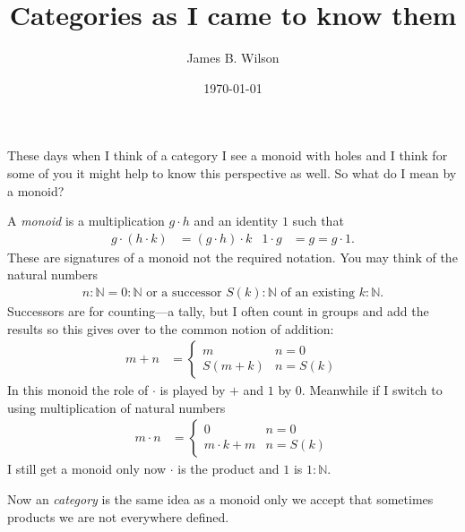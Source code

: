 \documentclass[12pt,twoside,letterpaper]{memoir}
\begin{document}
\author{James B. Wilson}
\title{Categories as I came to know them}
\date{\today}
\maketitle

These days when I think of a category I see a monoid with holes and I think for 
some of you it might help to know this perspective as well.  So what do I mean by a monoid?

A \emph{monoid} is a multiplication $g\cdot h$ and an identity $1$ such that
\begin{align*}
    g\cdot (h\cdot k) & = (g\cdot h)\cdot k 
    & 
    1\cdot g & = g = g\cdot 1.
\end{align*}
These are signatures of a monoid not the required notation.
You may think of the natural numbers 
\begin{align*}
    n:\mathbb{N} = 0:\mathbb{N} 
    \text{ or a successor } S(k):\mathbb{N} 
    \text{ of an existing } k:\mathbb{N}.
\end{align*}
Successors are for counting---a tally, but I often count in groups and 
add the results so this gives over to the common notion of addition:
\begin{align*}
    m+n & = \begin{cases} m & n=0\\ S(m+k) & n=S(k) \end{cases}
\end{align*}
In this monoid the role of $\cdot$ is played by $+$ and $1$ by $0$.
Meanwhile if I switch to using multiplication of natural numbers 
\begin{align*}
    m\cdot n & = \begin{cases} 0 & n=0\\ m\cdot k +m & n=S(k) \end{cases}
\end{align*}
I still get a monoid only now $\cdot$ is the product and $1$ is $1:\mathbb{N}$.

Now an \emph{category} is the same idea as a monoid only we accept
that sometimes products we are not everywhere defined.  
\end{document}
